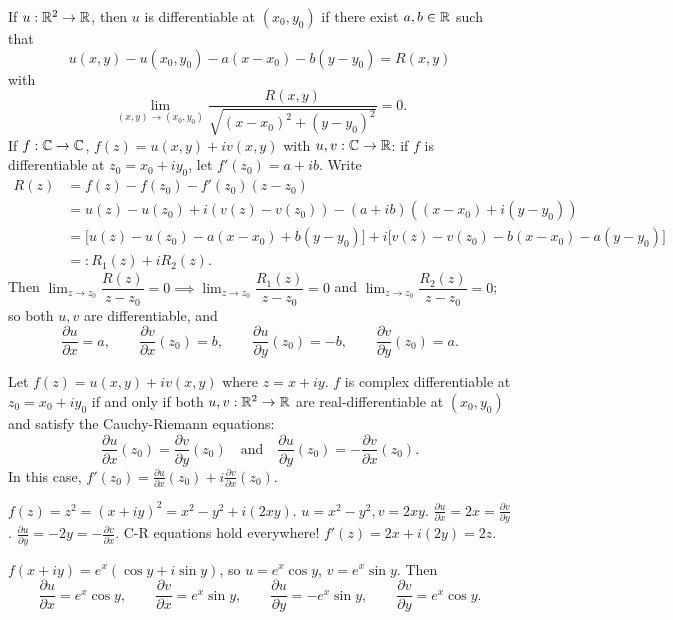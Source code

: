 \documentclass[11pt]{article}
\begin{document}
\begin{remark}
If $u:{\mathbb{R}}^2 \to {\mathbb{R}}$, then $u$ is differentiable at $(x_0,y_0)$ if there exist $a,b \in {\mathbb{R}}$ such that
\[
u(x,y) - u(x_0,y_0) - a(x-x_0) - b(y-y_0) = R(x,y)
\]
with
\[
\lim_{(x,y)\to(x_0,y_0)} \frac{R(x,y)}{\sqrt{(x-x_0)^2+(y-y_0)^2}} = 0.
\]
If $f: {\mathbb{C}} \to {\mathbb{C}}$, $f(z) = u(x,y) + iv(x,y)$ with $u,v: {\mathbb{C}} \to {\mathbb{R}}$: if $f$ is differentiable at $z_0 = x_0+iy_0$, let $f'(z_0) = a+ib$. Write
\begin{align*}
R(z) &= f(z) - f(z_0) - f'(z_0)(z-z_0) \\
&= u(z) - u(z_0) + i(v(z)-v(z_0)) - (a+ib)((x-x_0)+i(y-y_0)) \\
&= \big[u(z)-u(z_0) - a(x-x_0)+b(y-y_0)\big] + i\big[v(z)-v(z_0)-b(x-x_0)-a(y-y_0)\big] \\
&=: R_1(z) + iR_2(z).
\end{align*}
Then $\lim_{z\to z_0}\dfrac{R(z)}{z-z_0} = 0 \implies \lim_{z\to z_0}\dfrac{R_1(z)}{z-z_0} = 0$ and $\lim_{z\to z_0}\dfrac{R_2(z)}{z-z_0} = 0$; so both $u,v$ are differentiable, and
\[
\frac{\partial u}{\partial x} = a, \qquad \frac{\partial v}{\partial x}(z_0) = b, \qquad \frac{\partial u}{\partial y}(z_0) = -b, \qquad \frac{\partial v}{\partial y}(z_0) = a.
\]
\end{remark}

\begin{theorem}
Let $f(z) = u(x,y) + i v(x,y)$ where $z = x+iy$. $f$ is complex differentiable at $z_0 = x_0 + i y_0$ if and only if both $u, v: {\mathbb{R}}^2 \to {\mathbb{R}}$ are real-differentiable at $(x_0,y_0)$ and satisfy the Cauchy-Riemann equations:
\[
\frac{\partial u}{\partial x}(z_0) = \frac{\partial v}{\partial y}(z_0) \quad \text{and} \quad \frac{\partial u}{\partial y}(z_0) = -\frac{\partial v}{\partial x}(z_0).
\]
In this case, $f'(z_0) = \frac{\partial u}{\partial x}(z_0) + i \frac{\partial v}{\partial x}(z_0)$.
\end{theorem}

\begin{example}
$f(z) = z^2 = (x+iy)^2 = x^2 - y^2 + i(2xy)$.
$u = x^2 - y^2, v = 2xy$.
$\frac{\partial u}{\partial x} = 2x = \frac{\partial v}{\partial y}$.
$\frac{\partial u}{\partial y} = -2y = -\frac{\partial v}{\partial x}$.
C-R equations hold everywhere! $f'(z) = 2x + i(2y) = 2z$.
\end{example}

\begin{example}
$f(x+iy) = e^x(\cos y + i\sin y)$, so $u = e^x\cos y$, $v = e^x\sin y$. Then
\[
\frac{\partial u}{\partial x} = e^x\cos y, \qquad \frac{\partial v}{\partial x} = e^x\sin y, \qquad \frac{\partial u}{\partial y} = -e^x\sin y, \qquad \frac{\partial v}{\partial y} = e^x\cos y.
\]

\end{example}
\end{document}
